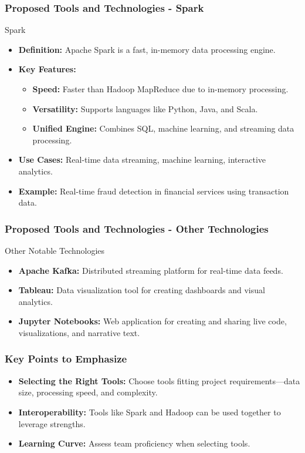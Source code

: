 \documentclass[aspectratio=169]{beamer}
\begin{document}
\begin{frame}[fragile]
    \frametitle{Proposed Tools and Technologies - Spark}
    \begin{block}{Spark}
        \begin{itemize}
            \item \textbf{Definition:} Apache Spark is a fast, in-memory data processing engine.
            \item \textbf{Key Features:}
                \begin{itemize}
                    \item \textbf{Speed:} Faster than Hadoop MapReduce due to in-memory processing.
                    \item \textbf{Versatility:} Supports languages like Python, Java, and Scala.
                    \item \textbf{Unified Engine:} Combines SQL, machine learning, and streaming data processing.
                \end{itemize}
            \item \textbf{Use Cases:} Real-time data streaming, machine learning, interactive analytics.
            \item \textbf{Example:} Real-time fraud detection in financial services using transaction data.
        \end{itemize}
    \end{block}
\end{frame}

\begin{frame}[fragile]
    \frametitle{Proposed Tools and Technologies - Other Technologies}
    \begin{block}{Other Notable Technologies}
        \begin{itemize}
            \item \textbf{Apache Kafka:} Distributed streaming platform for real-time data feeds.
            \item \textbf{Tableau:} Data visualization tool for creating dashboards and visual analytics.
            \item \textbf{Jupyter Notebooks:} Web application for creating and sharing live code, visualizations, and narrative text.
        \end{itemize}
    \end{block}
\end{frame}

\begin{frame}[fragile]
    \frametitle{Key Points to Emphasize}
    \begin{itemize}
        \item \textbf{Selecting the Right Tools:} Choose tools fitting project requirements—data size, processing speed, and complexity.
        \item \textbf{Interoperability:} Tools like Spark and Hadoop can be used together to leverage strengths.
        \item \textbf{Learning Curve:} Assess team proficiency when selecting tools.
    \end{itemize}
\end{frame}
\end{document}
